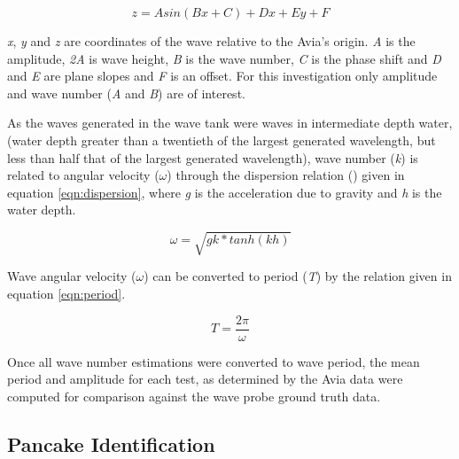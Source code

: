 \begin{equation} \label{eqn:avia_sin}
    z = Asin(Bx + C) + Dx + Ey + F
\end{equation}

\textit{x}, \textit{y} and \textit{z} are coordinates of the wave relative to the Avia's origin. \textit{A} is the amplitude, \textit{2A} is  wave height, \textit{B} is the wave number, \textit{C} is the phase shift and \textit{D} and \textit{E} are plane slopes and \textit{F} is an offset. For this investigation only amplitude and wave number (\textit{A} and \textit{B}) are of interest.

As the waves generated in the wave tank were waves in intermediate depth water, (water depth greater than a twentieth of the largest generated wavelength, but less than half that of the largest generated wavelength), wave number (\textit{k}) is related to angular velocity (\textit{$\omega$}) through the dispersion relation (\cite{dingemansWaterWavePropagation1997}) given in equation \ref{eqn:dispersion}, where \textit{g} is the acceleration due to gravity and \textit{h} is the water depth.

\begin{equation} \label{eqn:dispersion}
    \omega = \sqrt{gk*tanh(kh)}
\end{equation}

Wave angular velocity (\textit{$\omega$}) can be converted to period (\textit{T}) by the relation given in equation \ref{eqn:period}.

\begin{equation} \label{eqn:period}
    T = \frac{2\pi}{\omega} 
\end{equation}

Once all wave number estimations were converted to wave period, the mean period and amplitude for each test, as determined by the Avia data were computed for comparison against the wave probe ground truth data.

\subsection{Pancake Identification}
\label{subsec:ch6.section3.subsec4}

